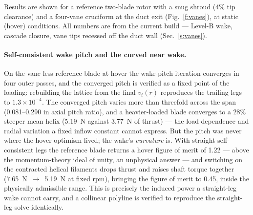 \documentclass[]{aiaa-tc}%
\begin{document}

Results are shown for a reference two-blade rotor with a snug shroud
(4\% tip clearance) and a four-vane cruciform at the duct exit
(Fig.~\ref{f:vanes}), at static (hover) conditions. All numbers are from the current build ---
Level-B wake, cascade closure, vane tips recessed off the duct wall
(Sec.~\ref{s:vanes}).

\paragraph{Self-consistent wake pitch and the curved near wake.} On
the vane-less reference blade at hover the wake-pitch iteration
converges in four outer passes, and the converged pitch is verified as
a fixed point of the loading: rebuilding the lattice from the final
$v_i(r)$ reproduces the trailing legs to $1.3\times10^{-4}$. The
converged pitch varies more than threefold across the span
(0.081--0.290 in axial pitch ratio), and a heavier-loaded blade
converges to a 28\% steeper mean helix (5.19~N against 3.77~N of
thrust) --- the load dependence and radial variation a fixed inflow
constant cannot express. But the pitch was never where the hover
optimism lived; the wake's \emph{curvature} is. With straight
self-consistent legs the reference blade returns a hover figure of
merit of 1.22 --- above the momentum-theory ideal of unity, an
unphysical answer --- and switching on the contracted helical
filaments drops thrust and raises shaft torque together
(7.65~N~$\to$~5.19~N at fixed rpm), bringing the figure of merit to
0.45, inside the physically admissible range. This is precisely the
induced power a straight-leg wake cannot carry, and a collinear
polyline is verified to reproduce the straight-leg solve identically.
\end{document}
